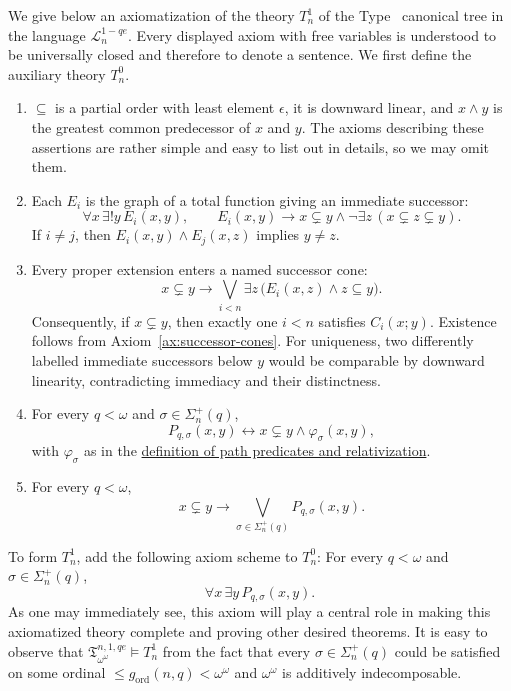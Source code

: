 \documentclass{amsart}
\theoremstyle{definition}
\begin{document}
We give below an axiomatization of the theory $T_n^1$ of the Type~\MakeUppercase{} canonical tree in the language $\mathcal L_n^{1-qe}$. Every displayed axiom with free variables is understood to be universally closed and therefore to denote a sentence. We first define the auxiliary theory $T_n^0$.
\begin{enumerate}[label=\textnormal{(A\arabic*)}]
    \item\label{ax:tree-order} $\subseteq$ is a partial order with least element $\epsilon$, it is downward linear, and $x\wedge y$ is the greatest common predecessor of $x$ and $y$. The axioms describing these assertions are rather simple and easy to list out in details, so we may omit them.

    \item\label{ax:named-successors} Each $E_i$ is the graph of a total function giving an immediate successor:
    $$\forall x\,\exists!y\,E_i(x,y),\qquad E_i(x,y)\longrightarrow x\subsetneq y\wedge\neg\exists z\,(x\subsetneq z\subsetneq y).$$
    If $i\neq j$, then $E_i(x,y)\wedge E_j(x,z)$ implies $y\neq z$.

    \item\label{ax:successor-cones} Every proper extension enters a named successor cone:
    $$x\subsetneq y\longrightarrow\bigvee_{i<n}\exists z\,\bigl(E_i(x,z)\wedge z\subseteq y\bigr).$$
    Consequently, if $x\subsetneq y$, then exactly one $i<n$ satisfies
    $C_i(x;y)$.  Existence follows from Axiom~\ref{ax:successor-cones}.  For uniqueness, two differently labelled immediate successors below $y$ would be comparable by downward linearity, contradicting immediacy and their distinctness.

    \item\label{ax:path-definitions} For every $q<\omega$ and
    $\sigma\in\Sigma_n^{+}(q)$,
    $$P_{q,\sigma}(x,y)\longleftrightarrow x\subsetneq y\wedge\varphi_\sigma(x,y),$$
    with $\varphi_\sigma$ as in the
    \hyperref[def:path-predicates]{definition of path predicates and relativization}.

    \item\label{ax:characteristic-exhaustion} For every $q<\omega$,
    $$x\subsetneq y\longrightarrow\bigvee_{\sigma\in\Sigma_n^{+}(q)}P_{q,\sigma}(x,y).$$
\end{enumerate}
To form $T_n^1$, add the following axiom scheme to $T_n^0$: \label{ax:characteristic-realization} For every $q<\omega$ and $\sigma\in\Sigma_n^{+}(q)$,
$$\forall x\,\exists y\,P_{q,\sigma}(x,y).$$
As one may immediately see, this axiom will play a central role in making this axiomatized theory complete and proving other desired theorems.
It is easy to observe that $\mathfrak{T}_{\omega^\omega}^{n,1,qe}\vDash T_n^1$ from the fact that every $\sigma\in\Sigma_n^{+}(q)$ could be satisfied on some ordinal $\leq g_{\mathrm{ord}}(n,q)<\omega^\omega$ and $\omega^\omega$ is additively indecomposable.
\end{document}
